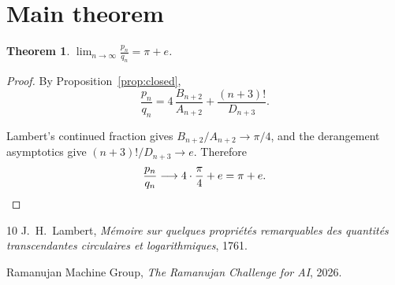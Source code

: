 \documentclass[11pt]{article}
\newtheorem{theorem}{Theorem}
\begin{document}
\section{Main theorem}

\begin{theorem}
$\displaystyle\lim_{n \to \infty} \frac{p_n}{q_n} = \pi + e$.
\end{theorem}

\begin{proof}
By Proposition~\ref{prop:closed},
\[
\frac{p_n}{q_n}
= 4\,\frac{B_{n+2}}{A_{n+2}}
+ \frac{(n+3)!}{D_{n+3}}.
\]

Lambert's continued fraction gives
$B_{n+2}/A_{n+2} \to \pi/4$, and the derangement asymptotics
give $(n+3)!/D_{n+3} \to e$.  Therefore
\[
\frac{p_n}{q_n} \longrightarrow 4 \cdot \frac{\pi}{4} + e
= \pi + e.
\qedhere
\]
\end{proof}

\begin{thebibliography}{10}
J.~H.~Lambert,
\emph{M\'emoire sur quelques propri\'et\'es remarquables
des quantit\'es transcendantes circulaires et logarithmiques},
1761.

Ramanujan Machine Group,
\emph{The Ramanujan Challenge for AI}, 2026.
\end{thebibliography}
\end{document}
